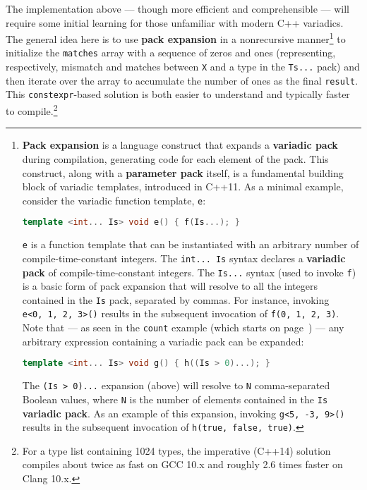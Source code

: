 \noindent The implementation above --- though more efficient and comprehensible
--- will require some initial learning for those unfamiliar with modern
C++ variadics. The general idea here is to use \textbf{pack expansion}
in a nonrecursive manner{\cprotect\footnote{\textbf{Pack expansion} is
a language construct that expands a \textbf{variadic pack} during
compilation, generating code for each element of the pack. This
construct, along with a \textbf{parameter pack} itself, is a
  fundamental building block of variadic templates,
  introduced in C++11. As a minimal example, consider the variadic
  function template, \texttt{e}:

  \begin{lstlisting}[language=C++, basicstyle={\ttfamily\footnotesize}]
  template <int... Is> void e() { f(Is...); }
  \end{lstlisting}

\noindent \texttt{e} is a function template that can be instantiated
  with an arbitrary number of compile-time-constant integers. The
  \texttt{int...}~\texttt{Is} syntax declares a \textbf{variadic pack}
  of compile-time-constant integers. The \texttt{Is...} syntax (used to
  invoke \texttt{f}) is a basic form of pack expansion that will resolve
  to all the integers contained in the \texttt{Is} pack, separated by
  commas. For instance, invoking
  \texttt{e<0,}~\texttt{1,}~\texttt{2,}~\texttt{3>()} results in the
  subsequent invocation of
  \texttt{f(0,}~\texttt{1,}~\texttt{2,}~\texttt{3)}. Note that --- as
  seen in the \texttt{count} example (which starts on page~\pageref{relaxedconstexpr-countcode}) --- any arbitrary
  expression containing a variadic pack can be expanded:

  \begin{lstlisting}[language=C++, basicstyle={\ttfamily\footnotesize}]
  template <int... Is> void g() { h((Is > 0)...); }
  \end{lstlisting}

\noindent The \texttt{(Is}~\texttt{>}~\texttt{0)...} expansion (above) will
  resolve to \texttt{N} comma-separated Boolean values, where \texttt{N}
  is the number of elements contained in the \texttt{Is}
  \textbf{variadic pack}. As an example of this expansion, invoking
  \texttt{g<5,}~\texttt{-3,}~\texttt{9>()} results in the subsequent invocation of \texttt{h(true,}~\texttt{false,}~\texttt{true)}.}} to
initialize the \texttt{matches} array with a sequence of zeros and ones
(representing, respectively, mismatch and matches between \texttt{X} and
a type in the \texttt{Ts...} pack) and then iterate over the array to
accumulate the number of ones as the final \texttt{result}. This
\texttt{constexpr}-based solution is both easier to understand and
typically faster to compile.{\cprotect\footnote{For a type list
containing 1024 types, the imperative (C++14) solution compiles about
twice as fast on GCC 10.x and roughly 2.6 times faster on Clang
  10.x.}}

